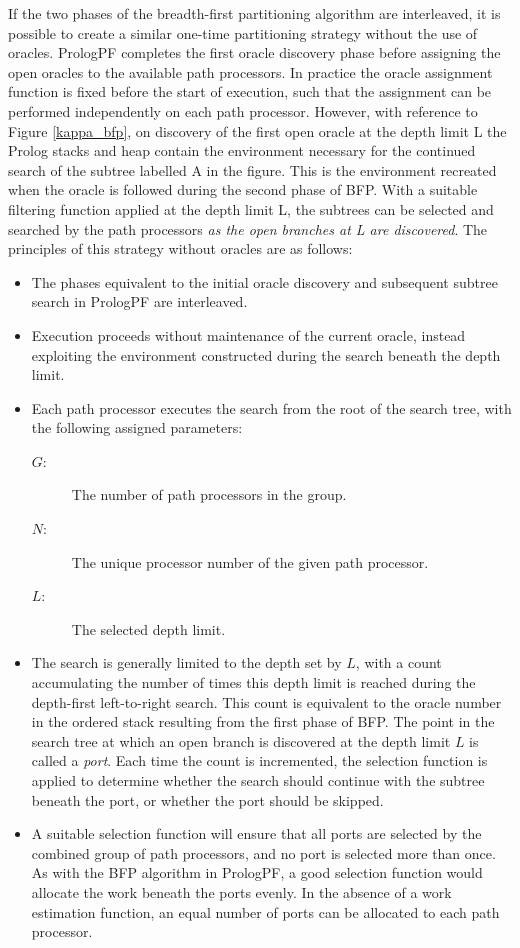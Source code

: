 If the two phases of the breadth-first partitioning algorithm are
interleaved, it is possible to create a similar one-time
partitioning strategy
without the use of oracles.  PrologPF completes the first oracle
discovery phase before assigning the open oracles to the available
path processors.  In practice the oracle assignment function is fixed
before the start of execution, such that the assignment can be
performed independently on each path processor.  However, with 
reference to Figure \ref{kappa_bfp}, on discovery of the first open
oracle at the depth limit L the Prolog stacks and heap contain the environment
necessary for the continued search of the subtree labelled A in the
figure.  This is the environment recreated when the oracle is followed
during the second phase of BFP.  With a suitable filtering function
applied at the depth limit L, the subtrees can be selected and searched
by the path processors \textit{as the open branches at L are discovered}.
The principles of this strategy without oracles are as follows:
\begin{itemize}
\item{The phases equivalent to the initial oracle discovery and 
  subsequent subtree search in PrologPF are interleaved.}
\item{Execution proceeds without maintenance of the current oracle,
  instead exploiting the environment constructed during the
  search beneath the depth limit.}
\item{Each path processor executes the search from the root of the
  search tree, with the following assigned parameters:
  \begin{description}
  \item[$G$: ]{The number of path processors in the group.}
  \item[$N$: ]{The unique processor number of the given path processor.}
  \item[$L$: ]{The selected depth limit.}
  \end{description}}
\item{The search is generally limited to the depth set by $L$, with a count
  accumulating the number of times this depth limit is reached during
  the depth-first left-to-right search.  This count is equivalent to the
  oracle number in the ordered stack resulting from the first phase of
  BFP.  The point in the search tree at which an open branch is discovered at
  the depth limit $L$ is called a \textit{port}.
  Each time the count is incremented, the selection function is
  applied to determine whether the search should continue with the subtree
  beneath the port, or whether the port should be skipped.}
\item{A suitable selection function will ensure that all ports are selected
  by the combined group of path processors, and no port is selected 
  more than once.  As with the BFP algorithm in PrologPF, a good selection
  function would allocate the work beneath the ports evenly.  In the
  absence of a work estimation function, an equal number of
  ports can be allocated to
  each path processor.}
\end{itemize}

